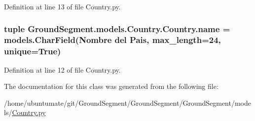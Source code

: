 Definition at line 13 of file Country.\+py.

\hypertarget{class_ground_segment_1_1models_1_1_country_1_1_country_a8269e1fb0841c68c00621be021128abc}{}
\subsubsection[{name}]{\setlength{\rightskip}{0pt plus 5cm}tuple Ground\+Segment.\+models.\+Country.\+Country.\+name = models.\+Char\+Field(\textquotesingle{}Nombre del Pais\textquotesingle{}, max\+\_\+length=24, unique=True)\hspace{0.3cm}{\ttfamily [static]}}\label{class_ground_segment_1_1models_1_1_country_1_1_country_a8269e1fb0841c68c00621be021128abc}


Definition at line 12 of file Country.\+py.



The documentation for this class was generated from the following file\+:\begin{DoxyCompactItemize}
\item 
/home/ubuntumate/git/\+Ground\+Segment/\+Ground\+Segment/\+Ground\+Segment/models/\hyperlink{_country_8py}{Country.\+py}\end{DoxyCompactItemize}
